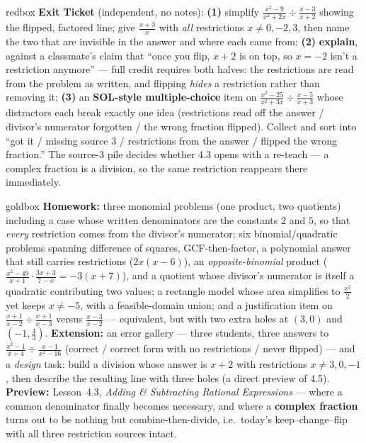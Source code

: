 \documentclass[10pt]{article}
\begin{document}
\begin{skillbox}{redbox}
\textbf{Exit Ticket} (independent, no notes): \textbf{(1)} simplify
$\frac{x^2-9}{x^2+2x}\div\frac{x-3}{x+2}$ showing the flipped, factored line; give
$\frac{x+3}{x}$ with \emph{all} restrictions $x\neq0,-2,3$, then name the two that are invisible in the
answer and where each came from; \textbf{(2)} \textbf{explain}, against a classmate's claim that
``once you flip, $x+2$ is on top, so $x=-2$ isn't a restriction anymore'' --- full credit requires both
halves: the restrictions are read from the problem as written, and flipping \emph{hides} a restriction
rather than removing it; \textbf{(3)} an \textbf{SOL-style multiple-choice} item on
$\frac{x^2-25}{x^2+3x}\div\frac{x-5}{x+3}$ whose distractors each break exactly one idea (restrictions
read off the answer / divisor's numerator forgotten / the wrong fraction flipped). Collect and sort
into ``got it / missing source 3 / restrictions from the answer / flipped the wrong fraction.'' The
source-3 pile decides whether 4.3 opens with a re-teach --- a complex fraction is a division, so the
same restriction reappears there immediately.
\end{skillbox}

\begin{skillbox}{goldbox}
\textbf{Homework:} three monomial problems (one product, two quotients) including a case whose written
denominators are the constants $2$ and $5$, so that \emph{every} restriction comes from the divisor's
numerator; six binomial/quadratic problems spanning difference of squares, GCF-then-factor, a
polynomial answer that still carries restrictions ($2x(x-6)$), an \emph{opposite-binomial} product
($\frac{x^2-49}{x+1}\cdot\frac{3x+3}{7-x}=-3(x+7)$), and a quotient whose divisor's numerator is itself
a quadratic contributing two values; a rectangle model whose area simplifies to $\frac{x^2}{2}$ yet
keeps $x\neq-5$, with a feasible-domain union; and a justification item on
$\frac{x+1}{x-2}\div\frac{x+1}{x-3}$ versus $\frac{x-3}{x-2}$ --- equivalent, but with two extra holes
at $(3,0)$ and $\left(-1,\frac43\right)$. \textbf{Extension:} an error gallery --- three students,
three answers to $\frac{x^2-1}{x+4}\div\frac{x-1}{x^2-16}$ (correct / correct form with no restrictions
/ never flipped) --- and a \emph{design} task: build a division whose answer is $x+2$ with restrictions
$x\neq3,0,-1$, then describe the resulting line with three holes (a direct preview of 4.5).
\textbf{Preview:} Lesson~4.3, \emph{Adding \& Subtracting Rational Expressions} --- where a common
denominator finally becomes necessary, and where a \textbf{complex fraction} turns out to be nothing
but combine-then-divide, i.e.\ today's keep--change--flip with all three restriction sources intact.
\end{skillbox}
\end{document}
